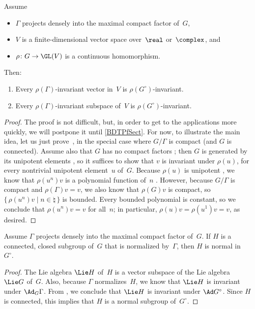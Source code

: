 \begin{thm}[(Borel)]
\label{BDT}
 Assume
 \begin{itemize}
 \item $\Gamma$ projects densely into the maximal compact factor of~$G$,
 \item $V$ is a finite-dimensional vector space
over\/~$\real$ or\/~$\complex$, and
 \item $\rho \colon G \to \GL(V)$ is a continuous
homomorphism.
 \end{itemize}
 Then:
 \begin{enumerate}
 \item \label{BDT-vector}
 Every $\rho(\Gamma)$-invariant vector in~$V$ is $\rho(G^\circ)$-invariant.
 \item \label{BDT-subspace}
 Every $\rho(\Gamma)$-invariant subspace of~$V$ is $\rho(G^\circ)$-invariant.
 \end{enumerate}
 \end{thm}

 \begin{proof}
 The proof is not difficult, but, in order to get to the applications more quickly, we will postpone it until \cref{BDTPfSect}. For now, to illustrate the main idea, let us just prove~, in the
special case where $G/\Gamma$ is compact (and $G$ is connected).
Assume also that
$G$ has no compact factors ; then $G$
is generated by its unipotent elements , so
it suffices to show that $v$ is invariant under $\rho(u)$,
for every nontrivial unipotent element~$u$ of~$G$. Because
$\rho(u)$ is unipotent ,
we know that $\rho(u^n) v$ is a polynomial function of~$n$ .
However, because $G/\Gamma$ is compact and $\rho(\Gamma) v
= v$, we also know that $\rho(G) v$ is compact, so
 $\{\, \rho(u^n) v \mid n \in \natural \,\}$ is bounded. Every
bounded polynomial is constant, so we conclude that
$\rho(u^n) v = v$ for all~$n$; in particular, $\rho(u)v =
\rho(u^1) v = v$, as desired.
 \end{proof}

\begin{cor} \label{BDT-normalize}
 Assume\/ $\Gamma$ projects densely into the maximal compact
factor of~$G$.
 If $H$ is a connected, closed subgroup of~$G$ that is
normalized by\/~$\Gamma$, then $H$ is normal in~$G^\circ$.
 \end{cor}

\begin{proof}
The Lie algebra $\Lie H$ of~$H$ is a vector subspace
of the Lie algebra~$\Lie G$ of~$G$. Also, because $\Gamma$ normalizes~$H$, 
we know that $\Lie H$ is invariant
under $\Ad_G \Gamma$. From , we
conclude that $\Lie H$ is invariant under $\Ad G^\circ$. Since $H$ is connected,
this implies that $H$ is a normal subgroup of~$G^\circ$.
 \end{proof}

